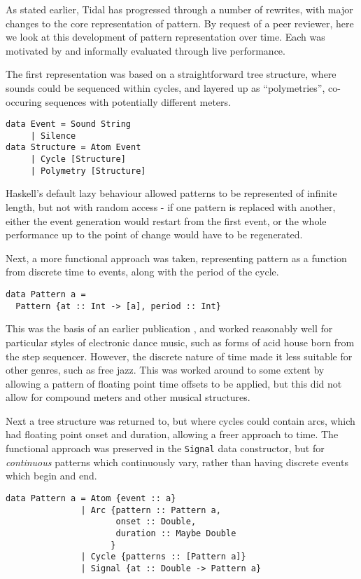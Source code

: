 \documentclass[authoryear,preprint]{sigplanconf}
\begin{document}
As stated earlier, Tidal has progressed through a number of rewrites,
with major changes to the core representation of pattern. By request
of a peer reviewer, here we look at this development of pattern
representation over time. Each was motivated by and informally
evaluated through live performance. 

The first representation was based on a straightforward tree
structure, where sounds could be sequenced within cycles, and layered
up as ``polymetries'', co-occuring sequences with potentially
different meters.

\begin{lstlisting}
data Event = Sound String
     | Silence
data Structure = Atom Event
     | Cycle [Structure]
     | Polymetry [Structure]
\end{lstlisting}

Haskell's default lazy behaviour allowed patterns to be represented of
infinite length, but not with random access - if one pattern is
replaced with another, either the event generation would restart from
the first event, or the whole performance up to the point of change
would have to be regenerated.

Next, a more functional approach was taken, representing pattern as a
function from discrete time to events, along with the period of the
cycle.

\begin{lstlisting}
data Pattern a =
  Pattern {at :: Int -> [a], period :: Int}
\end{lstlisting}

This was the basis of an earlier publication \citep{McLean10d}, and
worked reasonably well for particular styles of electronic dance
music, such as forms of acid house born from the step
sequencer. However, the discrete nature of time made it less suitable for
other genres, such as free jazz. This was worked around to some extent
by allowing a pattern of floating point time offsets to be applied,
but this did not allow for compound meters and other musical
structures.

Next a tree structure was returned to, but where cycles could contain
arcs, which had floating point onset and duration, allowing a freer
approach to time. The functional approach was preserved in the
\lstinline{Signal} data constructor, but for \emph{continuous}
patterns which continuously vary, rather than having discrete events
which begin and end.

\begin{lstlisting}
data Pattern a = Atom {event :: a}
               | Arc {pattern :: Pattern a,
                      onset :: Double,
                      duration :: Maybe Double
                     }
               | Cycle {patterns :: [Pattern a]}
               | Signal {at :: Double -> Pattern a}
\end{lstlisting}
\end{document}
